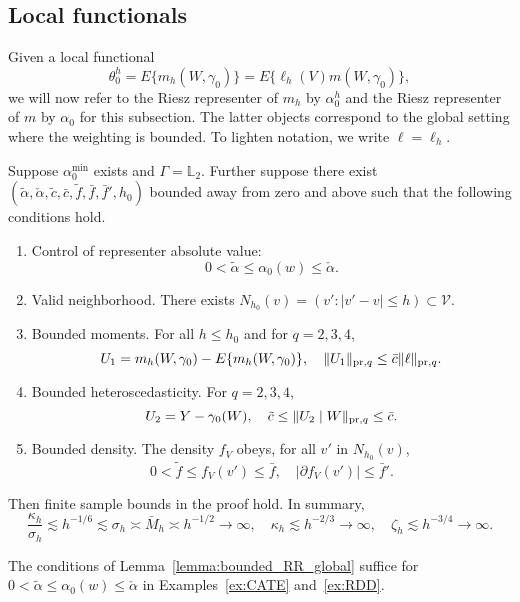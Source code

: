 \subsection{Local functionals}

Given a local functional
$$
\theta_0^h=E\{m_h(W,\gamma_0)\}=E\{\ell_h(V) m(W,\gamma_0)\},
$$
we will now refer to the Riesz representer of $m_h$ by $\alpha^h_0$ and the Riesz representer of $m$ by $\alpha_0$ for this subsection. The latter objects correspond to the global setting where the weighting is bounded. To lighten notation, we write $\ell=\ell_h$.

\begin{lemma}\label{lemma:local}
Suppose $\alpha_0^{\min}$ exists and $\Gamma=\mathbb{L}_2$. Further suppose there exist $(\tilde{\alpha}, \check{\alpha}, \tilde{c}, \bar c, \tilde{f}, \bar f, \bar f', h_0)$ bounded away from zero and above such that the following conditions hold.
\begin{enumerate}
    \item Control of representer absolute value:
    $$
0< \tilde{\alpha} \leq \alpha_0(w) \leq \check{\alpha}.
$$
  \item Valid neighborhood. There exists $N_{h_0}(v)=(v':|v'-v|\leq h)\subset \mathcal{V}$.
    \item Bounded moments. For all $ h\leq h_0$ and for $q=2,3,4$, 
    $$
    U_1=m_h(W,\gamma_0)-E\{m_h(W,\gamma_0)\},\quad \|U_1\|_{\text{\normalfont pr},q}\leq \bar{c}\|\ell\|_{\text{\normalfont pr},q}.
    $$
    \item Bounded heteroscedasticity. For $q=2,3,4$,
    $$
    U_2=Y-\gamma_0(W),\quad \tilde{c}\leq \|U_2 \mid W\|_{\text{\normalfont pr},q}\leq \bar{c}.
    $$
    \item Bounded density. The density $f_V$ obeys, for all $v'$ in $N_{h_0}(v)$,
    $$
  0< \tilde{f} \leq f_V(v') \leq \bar f,\quad |\partial f_V(v')| \leq \bar f'.
    $$
\end{enumerate}
Then finite sample bounds in the proof hold. In summary,
$$
\frac{\kappa_h}{\sigma_h} \lesssim h^{-1/6} \lesssim \sigma_h \asymp \bar{M}_h \asymp h^{-1/2} \rightarrow \infty,\quad \kappa_h\lesssim h^{-2/3} \rightarrow \infty,\quad \zeta_h\lesssim h^{-3/4} \rightarrow \infty.
$$

\end{lemma}

The conditions of Lemma~\ref{lemma:bounded_RR_global} suffice for $0< \tilde{\alpha} \leq \alpha_0(w) \leq \check{\alpha}$ in Examples~\ref{ex:CATE} and~\ref{ex:RDD}.


